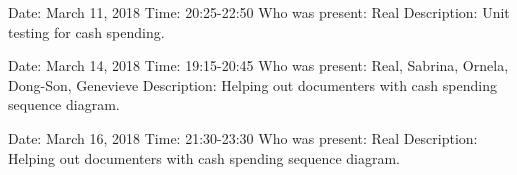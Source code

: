 \documentclass{article}
\begin{document}
\begin{flushleft}
Date: March 11, 2018 \newline
Time: 20:25-22:50 \newline
Who was present: Real\newline
Description: Unit testing for cash spending.\newline
\end{flushleft}
 
\begin{flushleft}
Date: March 14, 2018 \newline
Time: 19:15-20:45 \newline
Who was present: Real, Sabrina, Ornela, Dong-Son, Genevieve\newline
Description: Helping out documenters with cash spending sequence diagram.\newline
\end{flushleft}

\begin{flushleft}
Date: March 16, 2018 \newline
Time: 21:30-23:30 \newline
Who was present: Real\newline
Description: Helping out documenters with cash spending sequence diagram.\newline
\end{flushleft}
 
\end{document}
